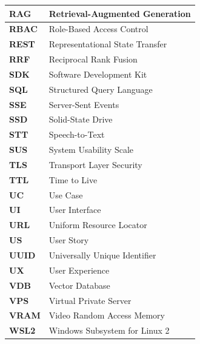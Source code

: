 \begin{longtable}{|p{3.5cm}|p{11cm}|}
    \hline
    \textbf{RAG}     & Retrieval-Augmented Generation \\
    \hline
    \textbf{RBAC}    & Role-Based Access Control \\
    \hline
    \textbf{REST}    & Representational State Transfer \\
    \hline
    \textbf{RRF}     & Reciprocal Rank Fusion \\
    \hline
    \textbf{SDK}     & Software Development Kit \\
    \hline
    \textbf{SQL}     & Structured Query Language \\
    \hline
    \textbf{SSE}     & Server-Sent Events \\
    \hline
    \textbf{SSD}     & Solid-State Drive \\
    \hline
    \textbf{STT}     & Speech-to-Text \\
    \hline
    \textbf{SUS}     & System Usability Scale \\
    \hline
    \textbf{TLS}     & Transport Layer Security \\
    \hline
    \textbf{TTL}     & Time to Live \\
    \hline
    \textbf{UC}      & Use Case \\
    \hline
    \textbf{UI}      & User Interface \\
    \hline
    \textbf{URL}     & Uniform Resource Locator \\
    \hline
    \textbf{US}      & User Story \\
    \hline
    \textbf{UUID}    & Universally Unique Identifier \\
    \hline
    \textbf{UX}      & User Experience \\
    \hline
    \textbf{VDB}     & Vector Database \\
    \hline
    \textbf{VPS}     & Virtual Private Server \\
    \hline
    \textbf{VRAM}    & Video Random Access Memory \\
    \hline
    \textbf{WSL2}    & Windows Subsystem for Linux 2 \\
    \hline

\end{longtable}
